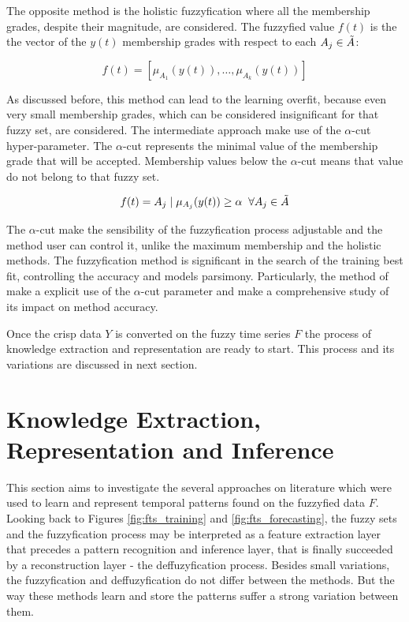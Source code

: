 The opposite method is the holistic fuzzyfication where all the membership grades, despite their magnitude, are considered. The fuzzyfied value $f(t)$ is the the vector of the $y(t)$ membership grades with respect to each $A_j \in \tilde{A}$:

\begin{equation}
f(t) = [\mu_{A_1}(y(t)), \ldots, \mu_{A_k}(y(t)) ]    
\label{eqn:fuzzyfication_holistic}
\end{equation}

As discussed before, this method can lead to the learning overfit, because even very small membership grades, which can be considered insignificant for that fuzzy set, are considered. The intermediate approach make use of the $\alpha$-cut hyper-parameter.
The $\alpha$-cut represents the minimal value of the membership grade that will be accepted. Membership values below the $\alpha$-cut means that value do not belong to that fuzzy set. 

\begin{equation}
f(t) = A_j\; |\; \mu_{A_j}(y(t)) \geq \alpha \;\; \forall A_j \in \tilde{A}    
\label{eqn:fuzzyfication_alpha}
\end{equation}

The $\alpha$-cut make the sensibility of the fuzzyfication process adjustable and the method user can control it, unlike the maximum membership and the holistic methods. The fuzzyfication method is significant in the search of the training best fit, controlling the accuracy and models parsimony. Particularly, the method of \cite{CarvalhoJr2017} make a explicit use of the $\alpha$-cut parameter and make a comprehensive study of its impact on method accuracy.

Once the crisp data $Y$ is converted on the fuzzy time series $F$ the process of knowledge extraction and representation are ready to start. This process and its variations are discussed in next section.

%
\section{Knowledge Extraction, Representation and Inference}
\label{sec:fts_knowledge}

This section aims to investigate the several approaches on literature which were used to learn and represent temporal patterns found on the fuzzyfied data $F$. Looking back to Figures \ref{fig:fts_training} and \ref{fig:fts_forecasting}, the fuzzy sets and the fuzzyfication process may be interpreted as a feature extraction layer that precedes a pattern recognition and inference layer, that is finally succeeded by a reconstruction layer - the deffuzyfication process. Besides small variations, the fuzzyfication and deffuzyfication do not differ between the methods. But the way these methods learn and store the patterns suffer a strong variation between them.

